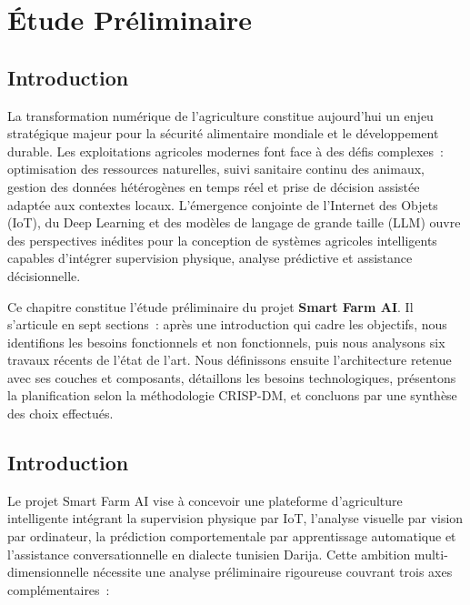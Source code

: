 \chapter{Étude Préliminaire}

\section*{Introduction}

La transformation numérique de l'agriculture constitue aujourd'hui un enjeu stratégique
majeur pour la sécurité alimentaire mondiale et le développement durable. Les exploitations
agricoles modernes font face à des défis complexes~: optimisation des ressources naturelles,
suivi sanitaire continu des animaux, gestion des données hétérogènes en temps réel et
prise de décision assistée adaptée aux contextes locaux.
L'émergence conjointe de l'Internet des Objets (IoT), du Deep Learning et des modèles
de langage de grande taille (LLM) ouvre des perspectives inédites pour la conception
de systèmes agricoles intelligents capables d'intégrer supervision physique, analyse
prédictive et assistance décisionnelle.

Ce chapitre constitue l'étude préliminaire du projet \textbf{Smart Farm AI}.
Il s'articule en sept sections~: après une introduction qui cadre les objectifs,
nous identifions les besoins fonctionnels et non fonctionnels, puis nous analysons
six travaux récents de l'état de l'art. Nous définissons ensuite l'architecture
retenue avec ses couches et composants, détaillons les besoins technologiques,
présentons la planification selon la méthodologie CRISP-DM, et concluons par une
synthèse des choix effectués.

\section{Introduction}

Le projet Smart Farm AI vise à concevoir une plateforme d'agriculture intelligente
intégrant la supervision physique par IoT, l'analyse visuelle par vision par ordinateur,
la prédiction comportementale par apprentissage automatique et l'assistance
conversationnelle en dialecte tunisien Darija.
Cette ambition multi-dimensionnelle nécessite une analyse préliminaire rigoureuse
couvrant trois axes complémentaires~:


